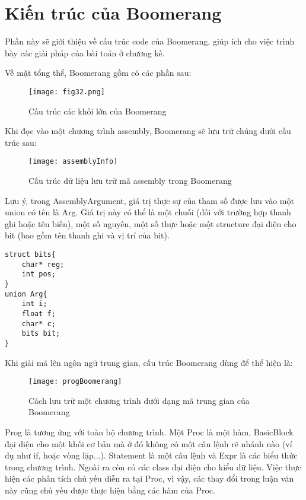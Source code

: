 \section{Kiến trúc của Boomerang}
Phần này sẽ giới thiệu về cấu trúc code của Boomerang, giúp ích cho việc trình bày các giải pháp của bài toán ở chương kế.

Về mặt tổng thể, Boomerang gồm có các phần sau:
\begin{figure}[h]
	\centering
	\texttt{[image: fig32.png]}
	\caption{Cấu trúc các khối lớn của Boomerang}
	\label{fig:boomstruct}
\end{figure}

Khi đọc vào một chương trình assembly, Boomerang sẽ lưu trữ chúng dưới cấu trúc sau:

\begin{figure}
	\centering
	\texttt{[image: assemblyInfo]}
	\caption{Cấu trúc dữ liệu lưu trữ mã assembly trong Boomerang}
	\label{fig:assemblyinfo}
\end{figure}

Lưu ý, trong AssemblyArgument, giá trị thực sự của tham số được lưu vào một union có tên là Arg. Giá trị này có thể là một chuỗi (đối với trường hợp thanh ghi hoặc tên biến), một số nguyên, một số thực hoặc một structure đại diện cho bit (bao gồm tên thanh ghi và vị trí của bit).
\begin{lstlisting}[caption={Đoạn mã mô tả cách biểu diễn giá trị của tham số trong Boomerang}, label={}]
struct bits{
	char* reg;
	int pos;
}
union Arg{
	int i;
	float f;
	char* c;
	bits bit;
}
\end{lstlisting}

Khi giải mã lên ngôn ngữ trung gian, cấu trúc Boomerang dùng để thể hiện là:

\begin{figure}
	\centering
	\texttt{[image: progBoomerang]}
	\caption{Cách lưu trữ một chương trình dưới dạng mã trung gian của Boomerang}
	\label{fig:progboomerang}
\end{figure}


Prog là tương ứng với toàn bộ chương trình. Một Proc là một hàm, BasicBlock đại diện cho một khối cơ bản mà ở đó không có một câu lệnh rẽ nhánh nào (ví dụ như if, hoặc vòng lặp...). Statement là một câu lệnh và Expr là các biểu thức trong chương trình. Ngoài ra còn có các class đại diện cho kiểu dữ liệu. Việc thực hiện các phân tích chủ yếu diễn ra tại Proc, vì vậy, các thay đổi trong luận văn này cũng chủ yếu được thực hiện bằng các hàm của Proc.\\

